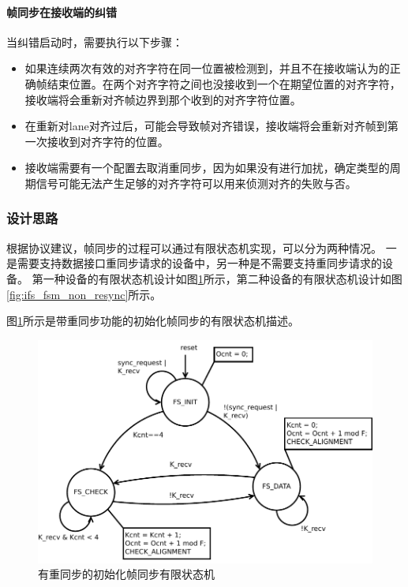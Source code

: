 \documentclass[UTF8]{ctexart}
\begin{document}
\paragraph{帧同步在接收端的纠错}

当纠错启动时，需要执行以下步骤：

\begin{itemize}
	\item 如果连续两次有效的对齐字符在同一位置被检测到，并且不在接收端认为的正确帧结束位置。在两个对齐字符之间也没接收到一个在期望位置的对齐字符，接收端将会重新对齐帧边界到那个收到的对齐字符位置。
	\item 在重新对lane对齐过后，可能会导致帧对齐错误，接收端将会重新对齐帧到第一次接收到对齐字符的位置。
	\item 接收端需要有一个配置去取消重同步，因为如果没有进行加扰，确定类型的周期信号可能无法产生足够的对齐字符可以用来侦测对齐的失败与否。
\end{itemize}

\subsubsection{设计思路}

根据协议建议，帧同步的过程可以通过有限状态机实现，可以分为两种情况。
一是需要支持数据接口重同步请求的设备中，另一种是不需要支持重同步请求的设备。
第一种设备的有限状态机设计如图\ref{fig:ifs_fsm_resync}所示，第二种设备的有限状态机设计如图\ref{fig:ifs_fsm_non_resync}所示。

图\ref{fig:ifs_fsm_resync}所示是带重同步功能的初始化帧同步的有限状态机描述。
\begin{figure}[H]
	\centering
	\includegraphics[width=16cm]{./img/ifs_fsm_resync.pdf}
	\caption{有重同步的初始化帧同步有限状态机}
	\label{fig:ifs_fsm_resync}
\end{figure}
\end{document}
